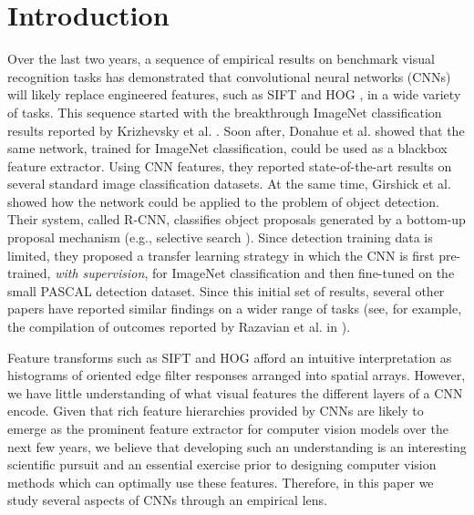 \section{Introduction}

Over the last two years, a sequence of empirical results on benchmark visual recognition tasks has demonstrated that convolutional neural networks (CNNs) \cite{fukushima1980neocognitron,Lecun89,rumelhart86} will likely replace engineered features, such as SIFT \cite{Sift} and HOG \cite{Hog}, in a wide variety of tasks.
This sequence started with the breakthrough ImageNet classification results reported by Krizhevsky et al. \cite{Kriz}.
Soon after, Donahue et al. \cite{Decaf} showed that the same network, trained for ImageNet classification, could be used as a blackbox feature extractor.
Using CNN features, they reported state-of-the-art results on several standard image classification datasets.
At the same time, Girshick et al. \cite{Rcnn} showed how the network could be applied to the problem of object detection.
Their system, called R-CNN, classifies object proposals generated by a bottom-up proposal mechanism (e.g., selective search \cite{UijlingsIJCV2013}).
Since detection training data is limited, they proposed a transfer learning strategy in which the CNN is first pre-trained, \emph{with supervision}, for ImageNet classification and then fine-tuned on the small PASCAL detection dataset.
Since this initial set of results, several other papers have reported similar findings on a wider range of tasks (see, for example, the compilation of outcomes reported by Razavian et al. in \cite{astounding}).

Feature transforms such as SIFT and HOG afford an intuitive interpretation as histograms of oriented edge filter responses arranged into spatial arrays.
However, we have little understanding of what visual features the different layers of a CNN encode.
Given that rich feature hierarchies provided by CNNs are likely to emerge as the prominent feature extractor for computer vision models over the next few years, we believe that developing such an understanding is an interesting scientific pursuit and an essential exercise prior to designing computer vision methods which can optimally use these features.
Therefore, in this paper we study several aspects of CNNs through an empirical lens.

